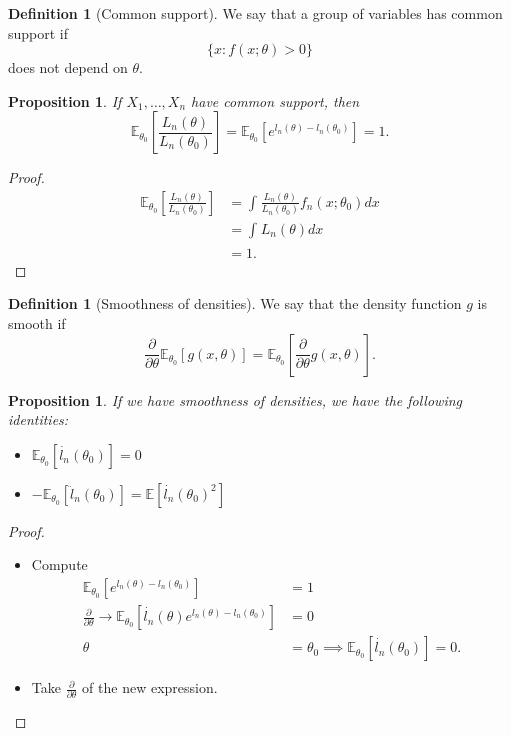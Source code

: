 \documentclass{tufte-handout}
\newcommand*\E{\mathbb{E}}
\newtheorem{prop}[thm]{Proposition}
\theoremstyle{definition}
\newtheorem{defn}[thm]{Definition}
\begin{document}
\begin{defn}[Common support]
	We say that a group of variables has common support if \[
		\{x: f(x;\theta) > 0\}
	\] does not depend on $\theta$.
\end{defn}


\begin{prop}
	If $X_1,\ldots,X_n$ have common support, then \[
		\E_{\theta_0}\left[\frac{L_n(\theta)}{L_n(\theta_0)}\right] = \E_{\theta_0}\left[e^{l_n(\theta) - l_n(\theta_0)}\right] = 1
	.\] 
\end{prop}

\begin{proof}
	\begin{align*}
		\E_{\theta_0}\left[\frac{L_n(\theta)}{L_n(\theta_0)}\right] &= \int_{}^{} \frac{L_n(\theta)}{L_n(\theta_0)} f_n(x; \theta_0) dx \\
																	&= \int_{}^{} L_n(\theta)dx \\
																	&= 1
	.\end{align*}
\end{proof}

\begin{defn}[Smoothness of densities]
	We say that the density function $g$ is smooth if \[
		\frac{\partial }{\partial \theta} \E_{\theta_0}\left[g(x,\theta)\right] = \E_{\theta_0}\left[\frac{\partial }{\partial \theta} g(x,\theta)\right] 
	.\] 
\end{defn}


\begin{prop}
	If we have smoothness of densities, we have the following identities:
	\begin{itemize}
		\item $\E_{\theta_0}\left[\dot{l_n}(\theta_0)\right] = 0$
		\item $-\E_{\theta_0}\left[\ddot{l}_n(\theta_0)\right] = \E\left[\dot{l_n}(\theta_0)^2\right] $
	\end{itemize} 
\end{prop}

\begin{proof}
	\begin{itemize}
		\item Compute
			\begin{align*}
				\E_{\theta_0}\left[e^{l_n(\theta) - l_n(\theta_0)}\right] &=  1 \\
				\frac{\partial }{\partial \theta} \rightarrow \E_{\theta_0}\left[\dot{l_n}(\theta) e^{l_n(\theta) - l_n(\theta_0)}\right] &= 0 \\
				\theta &= \theta_0 \implies \E_{\theta_0}\left[\dot{l_n}(\theta_0)\right] = 0
			.\end{align*}
		\item Take $\frac{\partial }{\partial \theta}$ of the new expression.
	\end{itemize}

\end{proof}
\end{document}
